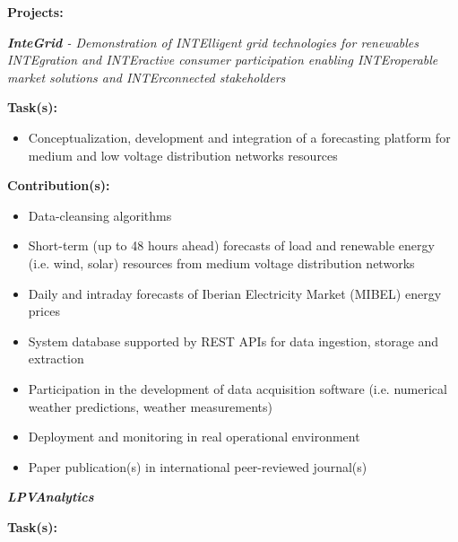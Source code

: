 \documentclass{mycv}
\begin{document}
\textbf{Projects:}
\vspace{0.1cm}

\begin{myitemize}	
	\item \textit{\textbf{InteGrid} - Demonstration of INTElligent grid technologies for renewables INTEgration and INTEractive consumer participation enabling INTEroperable market solutions and INTErconnected stakeholders}
	
		\vspace{0.4cm}
		\textbf{Task(s):}
		
		\begin{itemize}[itemsep=1px]
		\item Conceptualization, development and integration of a forecasting platform for medium and low voltage distribution networks resources
		\end{itemize}
	
		\vspace{0.2cm}
		\textbf{Contribution(s):}
		
		\begin{itemize}[itemsep=1px]
		\item Data-cleansing algorithms
		\item Short-term (up to 48 hours ahead) forecasts of load and renewable energy (i.e. wind, solar) resources from medium voltage distribution networks
		\item Daily and intraday forecasts of Iberian Electricity Market (MIBEL) energy prices
		\item System database supported by REST APIs for data ingestion, storage and extraction
		\item Participation in the development of data acquisition software (i.e. numerical weather predictions, weather measurements)
		\item Deployment and monitoring in real operational environment
		\item Paper publication(s) in international peer-reviewed journal(s)
		\end{itemize}
	
		\vspace{0.2cm}
		
	
	\vspace{0.6cm}	
	
	\item \textit{\textbf{LPVAnalytics}}
	
		\vspace{0.4cm}
		\textbf{Task(s):}
		

\end{myitemize}
\end{document}

